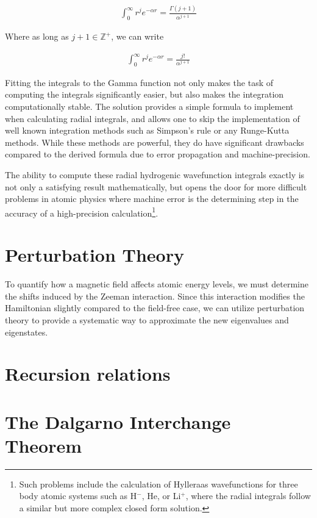             \begin{align}
                \int_0^\infty r^j e^{-\alpha r} = \frac{\Gamma(j + 1)}{\alpha^{j + 1}}
            \end{align}

            Where as long as $j + 1 \in \mathbb{Z}^+$, we can write

            \begin{align}
                \int_0^\infty r^j e^{-\alpha r} = \frac{j!}{\alpha^{j + 1}}
            \end{align}

            Fitting the integrals to the Gamma function not only makes the task of computing the integrals significantly easier, but also makes the integration computationally stable. The solution provides a simple formula to implement when calculating radial integrals, and allows one to skip the implementation of well known integration methods such as Simpson's rule or any Runge-Kutta methods. While these methods are powerful, they do have significant drawbacks compared to the derived formula due to error propagation and machine-precision.
            
            The ability to compute these radial hydrogenic wavefunction integrals exactly is not only a satisfying result mathematically, but opens the door for more difficult problems in atomic physics where machine error is the determining step in the accuracy of a high-precision calculation\footnote{Such problems include the calculation of Hylleraas wavefunctions for three body atomic systems such as H$^-$, He, or Li$^+$, where the radial integrals follow a similar but more complex closed form solution.}.
            
            

    \section{Perturbation Theory} \label{sec:Perturbation_Theory}
        To quantify how a magnetic field affects atomic energy levels, we must determine the shifts induced by the Zeeman interaction. Since this interaction modifies the Hamiltonian slightly compared to the field-free case, we can utilize perturbation theory to provide a systematic way to approximate the new eigenvalues and eigenstates.
    \section{Recursion relations} \label{sec:Recursion_Relations}
    \section{The Dalgarno Interchange Theorem} \label{sec:Dalgarno_Interchange_Theorem}
    
    